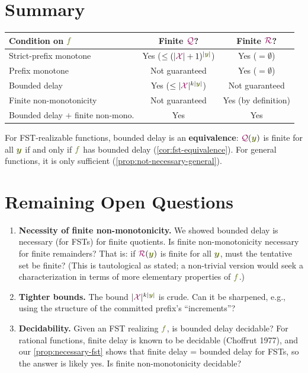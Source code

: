 \documentclass{article}
\newcommand{\Quotient}{{\color{TokenColor}\mathcal{Q}}}
\newcommand{\Remainder}{{\color{TokenColor}\mathcal{R}}}
\newcommand{\transFnSym}[0]{f}
\newcommand{\transFn}{\ensuremath{{\color{CharacterColor}\transFnSym}}\xspace}
\newcommand{\tgtStr}{{\color{CharacterColor}\boldsymbol{y}}}
\newcommand{\srcAlphabet}[0]{{\color{TokenColor}\ensuremath{\mathcal{X}}}\xspace}
\theoremstyle{plain}
\theoremstyle{definition}
\theoremstyle{remark}
\begin{document}
\section{Summary}
\label{sec:summary}

\begin{center}
\begin{tabular}{@{}lcc@{}}
\toprule
\textbf{Condition on $\transFn$} & \textbf{Finite $\Quotient$?} & \textbf{Finite $\Remainder$?} \\
\midrule
Strict-prefix monotone & Yes ($\leq (|\srcAlphabet|+1)^{|\tgtStr|}$) & Yes ($= \emptyset$) \\
Prefix monotone & Not guaranteed & Yes ($= \emptyset$) \\
Bounded delay & Yes ($\leq |\srcAlphabet|^{k|\tgtStr|}$) & Not guaranteed \\
Finite non-monotonicity & Not guaranteed & Yes (by definition) \\
\midrule
Bounded delay $+$ finite non-mono. & Yes & Yes \\
\bottomrule
\end{tabular}
\end{center}

\medskip\noindent
For FST-realizable functions, bounded delay is an \textbf{equivalence}:
$\Quotient(\tgtStr)$ is finite for all $\tgtStr$ if and only if $\transFn$ has
bounded delay (\cref{cor:fst-equivalence}).  For general functions, it is only
sufficient (\cref{prop:not-necessary-general}).


\section{Remaining Open Questions}
\label{sec:open}

\begin{enumerate}
\item \textbf{Necessity of finite non-monotonicity.}
  We showed bounded delay is necessary (for FSTs) for finite quotients.
  Is finite non-monotonicity necessary for finite remainders?  That is: if
  $\Remainder(\tgtStr)$ is finite for all $\tgtStr$, must the tentative set
  be finite?  (This is tautological as stated; a non-trivial version would
  seek a characterization in terms of more elementary properties of $\transFn$.)

\item \textbf{Tighter bounds.}
  The bound $|\srcAlphabet|^{k|\tgtStr|}$ is crude.  Can it be sharpened, e.g.,
  using the structure of the committed prefix's ``increments''?

\item \textbf{Decidability.}
  Given an FST realizing $\transFn$, is bounded delay decidable?  For rational
  functions, finite delay is known to be decidable (Choffrut 1977), and
  our \cref{prop:necessary-fst} shows that finite delay = bounded delay for
  FSTs, so the answer is likely yes.  Is finite non-monotonicity decidable?
\end{enumerate}
\end{document}
